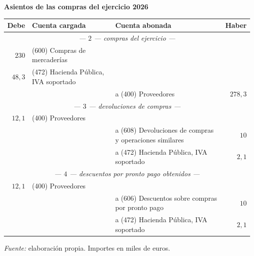 \documentclass[10pt,a4paper]{article}
\begin{document}
\begin{center}\begin{minipage}{\linewidth}\centering
{\small\textbf{Asientos de las compras del ejercicio 2026}}\par\vspace{0.3em}
{\small
\begin{tabular}{r p{5.6cm} p{6.4cm} r}
\hline
\textbf{Debe} & \textbf{Cuenta cargada} & \textbf{Cuenta abonada} & \textbf{Haber} \\
\hline
\multicolumn{4}{c}{\textit{--- $2$ --- compras del ejercicio ---}} \\
$230$ & (600) Compras de mercaderías & & \\
$48,3$ & (472) Hacienda Pública, IVA soportado & & \\
 & & \raggedright a (400) Proveedores & $278,3$ \\
\multicolumn{4}{c}{\textit{--- $3$ --- devoluciones de compras ---}} \\
$12,1$ & (400) Proveedores & & \\
 & & \raggedright a (608) Devoluciones de compras y operaciones similares & $10$ \\
 & & \raggedright a (472) Hacienda Pública, IVA soportado & $2,1$ \\
\multicolumn{4}{c}{\textit{--- $4$ --- descuentos por pronto pago obtenidos ---}} \\
$12,1$ & (400) Proveedores & & \\
 & & \raggedright a (606) Descuentos sobre compras por pronto pago & $10$ \\
 & & \raggedright a (472) Hacienda Pública, IVA soportado & $2,1$ \\
\hline
\end{tabular}}\par\vspace{0.3em}
{\small\textit{Fuente: }elaboración propia. Importes en miles de euros.}
\end{minipage}\end{center}
\end{document}
